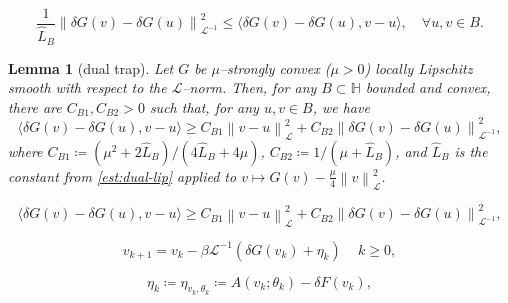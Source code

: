 \documentclass[10pt,a4paper]{amsart}
\newtheorem{lem}{Lemma}
\newcommand{\CddB}{{C_{B2}}} %
\newcommand{\CdvB}{{C_{B1}}} %
\newcommand{\HH}{\mathbb{H}}
\newcommand{\LL}{\mathcal{L}}
\newcommand{\LLinv}{{\mathcal{L}^{-1}}}
\newcommand{\dG}{{\delta G}}
\newcommand{\etak}{{\eta_{k}}}
\newcommand{\norm}[2]{\left\| #1 \right\| _{#2}}
\newcommand{\pairing}[2]{\bigl\langle #1 , #2 \bigr\rangle}
\newcommand{\s}{{\beta}}	%
\newcommand{\vk}{{v_{k}}}
\newcommand{\vkp}{{v_{k+1}}}
\begin{document}
	\begin{equation}\label{est:dual-lip}
		\frac{1}{\hat L_B}\norm{\delta G(v)-\delta G(u)}{\LLinv}^2 \le \pairing{\delta G(v)-\delta G(u)}{v-u}, \quad \forall u,v\in B.
	\end{equation}	

\begin{lem}[dual trap]\label{lem:dream}
	Let $G$ be $\mu$--strongly convex ($\mu>0$) locally Lipschitz smooth with respect to the $\LL$--norm. Then, for any $B\subset\HH$ bounded and convex, there are $\CdvB,\CddB>0$ such that, for any $u,v\in B$, we have
	\begin{equation}\label{est:dream}
		\pairing{\delta G(v)-\delta G(u)}{v-u} \ge \CdvB\norm{v-u}{\LL}^2+\CddB\norm{\delta G(v)-\delta G(u)}{\LLinv}^2,
	\end{equation}
	where $\CdvB \coloneqq(\mu^2 + 2\hat L_B)/(4\hat L_B+4\mu)$, $\CddB \coloneqq 1/(\mu+\hat L_B)$, and $\hat L_B$ is the constant from \eqref{est:dual-lip} applied to $v \mapsto G(v)-\frac \mu 4 \norm{v}{\LL}^2$.
\end{lem}

	\begin{equation}
		\pairing{\delta G(v)-\delta G(u)}{v-u} \ge \CdvB\norm{v-u}{\LL}^2+\CddB\norm{\delta G(v)-\delta G(u)}{\LLinv}^2,
	\end{equation}

	\begin{equation}
	\label{mthd:PPGD}
\vkp = \vk - \s\LLinv(\dG(\vk) + \etak) \quad \, k\ge 0,
	\end{equation}

	\begin{equation}\label{def:perturbation-PPGD}
\eta_k \coloneqq \eta_{v_k,\theta_k}\coloneqq   A(v_k;\theta_k) - \delta F(v_k),
	\end{equation}
\end{document}
